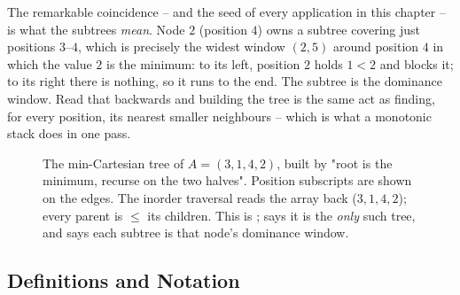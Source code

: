 The remarkable coincidence -- and the seed of every application in this chapter -- is what the
subtrees \emph{mean}. Node $2$ (position $4$) owns a subtree covering just positions $3$--$4$, which is
precisely the widest window $(2,5)$ around position $4$ in which the value $2$ is the minimum: to its
left, position $2$ holds $1<2$ and blocks it; to its right there is nothing, so it runs to the end. The
subtree is the dominance window. Read that backwards and building the tree is the same act as finding,
for every position, its nearest smaller neighbours -- which is what a monotonic stack does in one pass.

\begin{figure}[H]
\centering
{}
\caption{The min-Cartesian tree of $A=(3,1,4,2)$, built by "root is the minimum, recurse on the two
halves". Position subscripts are shown on the edges. The inorder traversal reads the array back
($3,1,4,2$); every parent is $\le$ its children. This is ; 
says it is the \emph{only} such tree, and  says each subtree is that node's
dominance window.}\label{fig:c26-build}
\end{figure}

\subsection{Definitions and Notation}

